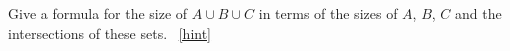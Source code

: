 \documentclass{book}
\begin{document}
\setcounter{project}{219}
\addtocounter{project}{-1}
\begin{activity}[]\label{threesetintersection}
\hypertarget{p-1226}{}%
Give a formula for the size of \(A\cup B\cup C\) in terms of the sizes of \(A\), \(B\), \(C\) and the intersections of these sets.%
~\hfill{\tiny\hyperlink{a-219}{[hint]}\hypertarget{q-219}{}}\end{activity}
\end{document}
